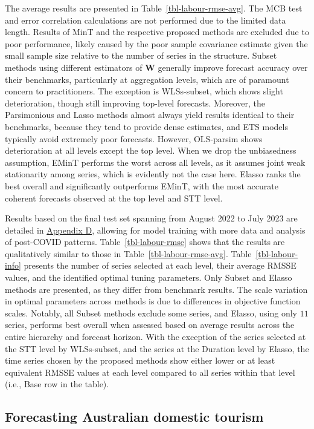 \documentclass[
  11pt]{article}
\theoremstyle{plain}
\theoremstyle{remark}
\begin{document}
The average results are presented in Table~\ref{tbl-labour-rmse-avg}.
The MCB test and error correlation calculations are not performed due to
the limited data length. Results of MinT and the respective proposed
methods are excluded due to poor performance, likely caused by the poor
sample covariance estimate given the small sample size relative to the
number of series in the structure. Subset methods using different
estimators of \(\bm{W}\) generally improve forecast accuracy over their
benchmarks, particularly at aggregation levels, which are of paramount
concern to practitioners. The exception is WLSs-subset, which shows
slight deterioration, though still improving top-level forecasts.
Moreover, the Parsimonious and Lasso methods almost always yield results
identical to their benchmarks, because they tend to provide dense
estimates, and ETS models typically avoid extremely poor forecasts.
However, OLS-parsim shows deterioration at all levels except the top
level. When we drop the unbiasedness assumption, EMinT performs the
worst across all levels, as it assumes joint weak stationarity among
series, which is evidently not the case here. Elasso ranks the best
overall and significantly outperforms EMinT, with the most accurate
coherent forecasts observed at the top level and STT level.

Results based on the final test set spanning from August 2022 to July
2023 are detailed in \hyperref[appendix-labour]{Appendix D}, allowing
for model training with more data and analysis of post-COVID patterns.
Table~\ref{tbl-labour-rmse} shows that the results are qualitatively
similar to those in Table~\ref{tbl-labour-rmse-avg}.
Table~\ref{tbl-labour-info} presents the number of series selected at
each level, their average RMSSE values, and the identified optimal
tuning parameters. Only Subset and Elasso methods are presented, as they
differ from benchmark results. The scale variation in optimal parameters
across methods is due to differences in objective function scales.
Notably, all Subset methods exclude some series, and Elasso, using only
\(11\) series, performs best overall when assessed based on average
results across the entire hierarchy and forecast horizon. With the
exception of the series selected at the STT level by WLSs-subset, and
the series at the Duration level by Elasso, the time series chosen by
the proposed methods show either lower or at least equivalent RMSSE
values at each level compared to all series within that level (i.e.,
Base row in the table).

\subsection{Forecasting Australian domestic tourism}\label{sec-tourism}
\end{document}
